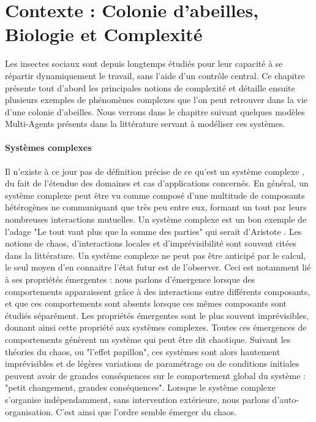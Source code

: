 \chapter*{Contexte : Colonie d'abeilles, Biologie et Complexité}
	
	Les insectes sociaux sont depuis longtemps étudiés pour leur capacité à se répartir dynamiquement le travail, sans l'aide d'un contrôle central. Ce chapitre présente tout d'abord les principales notions de complexité et détaille ensuite plusieurs exemples de phénomènes complexes que l'on peut retrouver dans la vie d'une colonie d'abeilles. Nous verrons dans le chapitre suivant quelques modèles Multi-Agents présents dans la littérature servant à modéliser ces systèmes.

	
		\subsubsection{Systèmes complexes}
		
			Il n'existe à ce jour pas de définition précise de ce qu'est un système complexe \cite{heylighen_complexity_2008}, du fait de l'étendue des domaines et cas d'applications concernés. En général, un système complexe peut être vu comme composé d'une multitude de composants hétérogènes ne communiquant que très peu entre eux, formant un tout par leurs nombreuses interactions mutuelles. Un système complexe est un bon exemple de l'adage "Le tout vaut plus que la somme des parties" qui serait d'Aristote \cite{edmonds_what_1999}. Les notions de chaos, d'interactions locales et d'imprévisibilité sont souvent citées dans la littérature. Un système complexe ne peut pas être anticipé par le calcul, le seul moyen d'en connaitre l'état futur est de l'observer. 
			Ceci est notamment lié à ses propriétés émergentes : nous parlons d'émergence lorsque des comportements apparaissent grâce à des interactions entre différents composants, et que ces comportements sont absents lorsque ces mêmes composants sont étudiés séparément. Les propriétés émergentes sont le plus souvent imprévisibles, donnant ainsi cette propriété aux systèmes complexes. Toutes ces émergences de comportements génèrent un système qui peut être dit chaotique. 
			Suivant les théories du chaos, ou "l'effet papillon", ces systèmes sont alors hautement imprévisibles et de légères variations de paramétrage ou de conditions initiales peuvent avoir de grandes conséquences sur le comportement global du système : "petit changement, grandes conséquences". Lorsque le système complexe s'organise indépendamment, sans intervention extérieure, nous parlons d'auto-organisation. C'est ainsi que l'ordre semble émerger du chaos.
			

